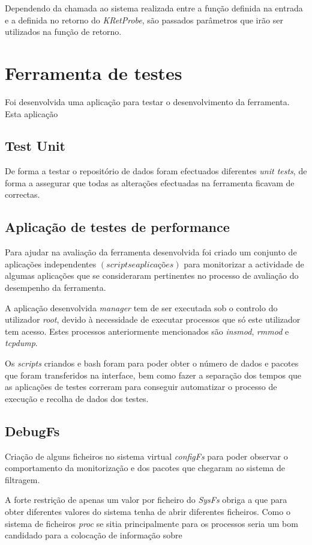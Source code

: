 Dependendo da chamada ao sistema realizada entre a função definida na entrada
e a definida no retorno do \textit{KRetProbe}, são passados parâmetros que irão
ser utilizados na função de retorno.


\section{Ferramenta de testes}

Foi desenvolvida uma aplicação para testar o desenvolvimento da ferramenta.
Esta aplicação 

\subsection{Test Unit}

De forma a testar o repositório de dados foram efectuados diferentes
\textit{unit tests}, de forma a assegurar que todas as alterações efectuadas na
ferramenta ficavam de correctas.

\subsection{Aplicação de testes de performance}

Para ajudar na avaliação da ferramenta desenvolvida foi criado um conjunto de
aplicações independentes $\left( scripts e aplicações \right)$ para monitorizar
a actividade de algumas aplicações que se consideraram pertinentes no processo
de avaliação do desempenho da ferramenta.

A aplicação desenvolvida \textit{manager} tem de ser executada sob o controlo
do utilizador \textit{root}, devido à necessidade de executar processos que só
este utilizador tem acesso. Estes processos anteriormente mencionados são
\textit{insmod}, \textit{rmmod} e \textit{tcpdump}.

Os \textit{scripts} criandos e bash foram para poder obter o número de dados e
pacotes que foram transferidos na interface, bem como fazer a separação dos
tempos que as aplicações de testes correram para conseguir automatizar o
processo de execução e recolha de dados dos testes.

\subsection{DebugFs}

Criação de alguns ficheiros no sistema virtual \textit{configFs} para poder
observar o comportamento da monitorização e dos pacotes que chegaram ao sistema
de filtragem.

A forte restrição de apenas um valor por ficheiro do \textit{SysFs} obriga a
que para obter diferentes valores do sistema tenha de abrir diferentes
ficheiros. Como o sistema de ficheiros \textit{proc} se sitia principalmente
para os processos seria um bom candidado para a colocação de informação sobre 
